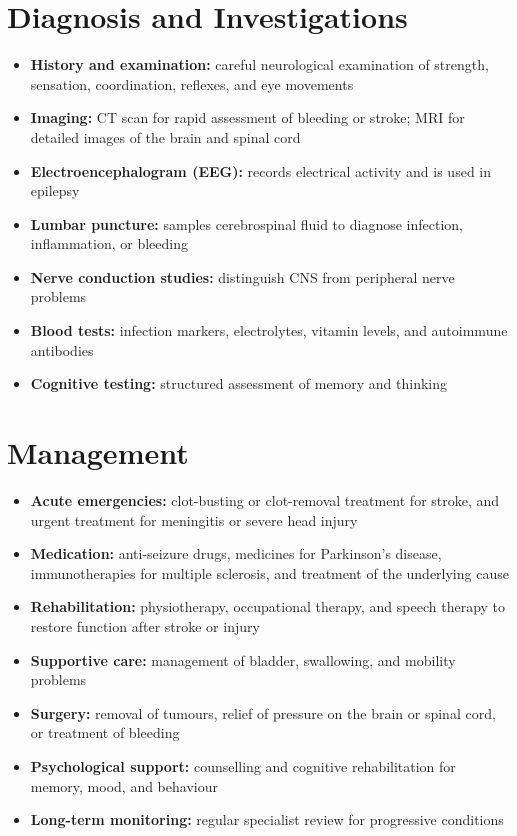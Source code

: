 \section*{Diagnosis and Investigations}
\begin{itemize}
    \item \textbf{History and examination:} careful neurological examination of strength, sensation, coordination, reflexes, and eye movements
    \item \textbf{Imaging:} CT scan for rapid assessment of bleeding or stroke; MRI for detailed images of the brain and spinal cord
    \item \textbf{Electroencephalogram (EEG):} records electrical activity and is used in epilepsy
    \item \textbf{Lumbar puncture:} samples cerebrospinal fluid to diagnose infection, inflammation, or bleeding
    \item \textbf{Nerve conduction studies:} distinguish CNS from peripheral nerve problems
    \item \textbf{Blood tests:} infection markers, electrolytes, vitamin levels, and autoimmune antibodies
    \item \textbf{Cognitive testing:} structured assessment of memory and thinking
\end{itemize}

\section*{Management}
\begin{itemize}
    \item \textbf{Acute emergencies:} clot-busting or clot-removal treatment for stroke, and urgent treatment for meningitis or severe head injury
    \item \textbf{Medication:} anti-seizure drugs, medicines for Parkinson's disease, immunotherapies for multiple sclerosis, and treatment of the underlying cause
    \item \textbf{Rehabilitation:} physiotherapy, occupational therapy, and speech therapy to restore function after stroke or injury
    \item \textbf{Supportive care:} management of bladder, swallowing, and mobility problems
    \item \textbf{Surgery:} removal of tumours, relief of pressure on the brain or spinal cord, or treatment of bleeding
    \item \textbf{Psychological support:} counselling and cognitive rehabilitation for memory, mood, and behaviour
    \item \textbf{Long-term monitoring:} regular specialist review for progressive conditions
\end{itemize}

